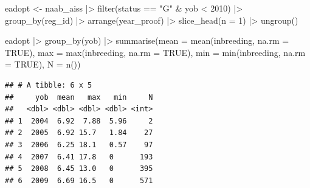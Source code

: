 \documentclass[
]{article}
\newenvironment{Shaded}{\begin{snugshade}}{\end{snugshade}}
\newcommand{\AttributeTok}[1]{\textcolor[rgb]{0.77,0.63,0.00}{#1}}
\newcommand{\ConstantTok}[1]{\textcolor[rgb]{0.00,0.00,0.00}{#1}}
\newcommand{\DecValTok}[1]{\textcolor[rgb]{0.00,0.00,0.81}{#1}}
\newcommand{\FunctionTok}[1]{\textcolor[rgb]{0.00,0.00,0.00}{#1}}
\newcommand{\NormalTok}[1]{#1}
\newcommand{\OtherTok}[1]{\textcolor[rgb]{0.56,0.35,0.01}{#1}}
\newcommand{\SpecialCharTok}[1]{\textcolor[rgb]{0.00,0.00,0.00}{#1}}
\newcommand{\StringTok}[1]{\textcolor[rgb]{0.31,0.60,0.02}{#1}}
\begin{document}
\begin{Shaded}
\begin{Highlighting}[]
\NormalTok{eadopt }\OtherTok{\textless{}{-}}\NormalTok{ naab\_aiss }\SpecialCharTok{|\textgreater{}}
  \FunctionTok{filter}\NormalTok{(status }\SpecialCharTok{==} \StringTok{"G"} \SpecialCharTok{\&}\NormalTok{ yob }\SpecialCharTok{\textless{}} \DecValTok{2010}\NormalTok{) }\SpecialCharTok{|\textgreater{}}
  \FunctionTok{group\_by}\NormalTok{(reg\_id) }\SpecialCharTok{|\textgreater{}}
  \FunctionTok{arrange}\NormalTok{(year\_proof) }\SpecialCharTok{|\textgreater{}}
  \FunctionTok{slice\_head}\NormalTok{(}\AttributeTok{n =} \DecValTok{1}\NormalTok{) }\SpecialCharTok{|\textgreater{}}
  \FunctionTok{ungroup}\NormalTok{()}

\NormalTok{eadopt }\SpecialCharTok{|\textgreater{}}
  \FunctionTok{group\_by}\NormalTok{(yob) }\SpecialCharTok{|\textgreater{}}
  \FunctionTok{summarise}\NormalTok{(}\AttributeTok{mean =} \FunctionTok{mean}\NormalTok{(inbreeding, }\AttributeTok{na.rm =} \ConstantTok{TRUE}\NormalTok{), }
            \AttributeTok{max =} \FunctionTok{max}\NormalTok{(inbreeding, }\AttributeTok{na.rm =} \ConstantTok{TRUE}\NormalTok{), }
            \AttributeTok{min =} \FunctionTok{min}\NormalTok{(inbreeding, }\AttributeTok{na.rm =} \ConstantTok{TRUE}\NormalTok{), }
            \AttributeTok{N =} \FunctionTok{n}\NormalTok{())}
\end{Highlighting}
\end{Shaded}

\begin{verbatim}
## # A tibble: 6 x 5
##     yob  mean   max   min     N
##   <dbl> <dbl> <dbl> <dbl> <int>
## 1  2004  6.92  7.88  5.96     2
## 2  2005  6.92 15.7   1.84    27
## 3  2006  6.25 18.1   0.57    97
## 4  2007  6.41 17.8   0      193
## 5  2008  6.45 13.0   0      395
## 6  2009  6.69 16.5   0      571
\end{verbatim}
\end{document}

